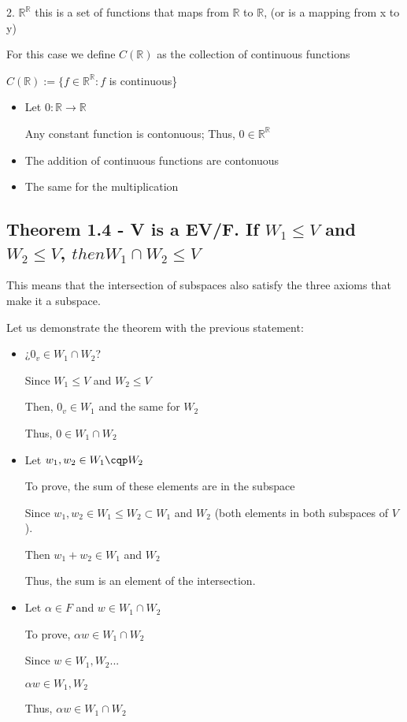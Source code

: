 \documentclass{article}
\begin{document}
2. \(\mathbb{R}^{\mathbb{R}}\) this is a set of functions that maps from \(\mathbb{R}\) to \(\mathbb{R}\), (or is a mapping from x to y)

For this case we define \(C(\mathbb{R})\) as the collection of continuous functions

\(C(\mathbb{R}) := \{f \in \mathbb{R}^{\mathbb{R}} : f \) is continuous\}

\begin{itemize}
    \item Let \(0 : \mathbb{R} \rightarrow \mathbb{R}\)

    Any constant function is contonuous; Thus, \(0 \in \mathbb{R}^{\mathbb{R}}\)

    \item The addition of continuous functions are contonuous

    \item The same for the multiplication
\end{itemize}

\subsection*{Theorem 1.4 - V is a EV/F. If \(W_1 \leq V\) and \(W_2 \leq V\), \(then W_1 \cap W_2 \leq V\)}
This means that the intersection of  subspaces also satisfy the three axioms that make it a subspace.

Let us demonstrate the theorem with the previous statement:

\begin{itemize}
    \item ¿\(0_v \in W_1 \cap W_2\)?
    
    Since \(W_1 \leq V\) and \(W_2 \leq V\)
    
    Then, \(0_v \in W_1\) and the same for \(W_2\)

    Thus, \(0 \in W_1 \cap W_2\)

    \item Let \(w_1, w_2 \in W_1 \cqp W_2\)

    To prove, the sum of these elements are in the subspace

    Since \(w_1, w_2 \in W_1 \leq W_2 \subset W_1\) and \(W_2\) (both elements in both subspaces of \(V\)).

    Then \(w_1 + w_2 \in W_1\) and \(W_2\)

    Thus, the sum is an element of the intersection.

    \item Let \(\alpha \in F \) and \(w \in W_1\cap W_2\)

    To prove, \(\alpha w \in W_1 \cap W_2\)

    Since \(w \in W_1, W_2\)...

    \(\alpha w \in W_1, W_2\)

    Thus, \(\alpha w \in W_1\cap W_2\)
\end{itemize}
\end{document}
